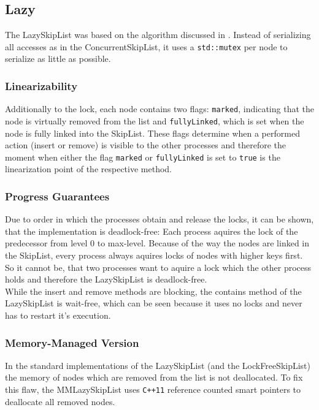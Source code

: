 \subsection{Lazy}
The LazySkipList was based on the algorithm discussed in \cite{}. Instead of serializing all accesses as in the ConcurrentSkipList, it uses a \texttt{std::mutex} per node to serialize as little as possible.

\subsubsection*{Linearizability}
Additionally to the lock, each node contains two flags: \texttt{marked}, indicating that the node is virtually removed from the list and \texttt{fullyLinked}, which is set when the node is fully linked into the SkipList. These flags determine when a performed action (insert or remove) is visible to the other processes and therefore the moment when either the flag \texttt{marked} or \texttt{fullyLinked} is set to \texttt{true} is the linearization point of the respective method.

\subsubsection*{Progress Guarantees}
Due to order in which the processes obtain and release the locks, it can be shown, that the implementation is deadlock-free: Each process aquires the lock of the predecessor from level 0 to max-level. Because of the way the nodes are linked in the SkipList, every process always aquires locks of nodes with higher keys first. So it cannot be, that two processes want to aquire a lock which the other process holds and therefore the LazySkipList is deadlock-free.\\
While the insert and remove methods are blocking, the contains method of the LazySkipList is wait-free, which can be seen because it uses no locks and never has to restart it's execution.

\subsubsection*{Memory-Managed Version}
In the standard implementations of the LazySkipList (and the LockFreeSkipList) the memory of nodes which are removed from the list is not deallocated. To fix this flaw, the MMLazySkipList uses \texttt{C++11} reference counted smart pointers to deallocate all removed nodes.

